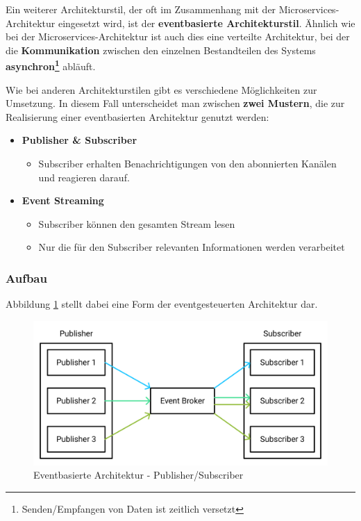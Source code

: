     Ein weiterer Architekturstil, der oft im Zusammenhang mit der Microservices-Architektur eingesetzt wird, ist der \textbf{eventbasierte Architekturstil}. Ähnlich wie bei der Microservices-Architektur ist auch dies eine verteilte Architektur, bei der die \textbf{Kommunikation} zwischen den einzelnen Bestandteilen des Systems \textbf{asynchron\footnote{Senden/Empfangen von Daten ist zeitlich versetzt}} abläuft. \\
    \cite[S. 183]{EA:Book02}

    Wie bei anderen Architekturstilen gibt es verschiedene Möglichkeiten zur Umsetzung. In diesem Fall unterscheidet man zwischen \textbf{zwei Mustern}, die zur Realisierung einer eventbasierten Architektur genutzt werden:
    \begin{itemize}
        \item \textbf{Publisher \& Subscriber}
        \begin{itemize}[label=$\circ$]
            \item Subscriber erhalten Benachrichtigungen von den abonnierten Kanälen und reagieren darauf.  
        \end{itemize}
        
        \item \textbf{Event Streaming}
        \begin{itemize}[label=$\circ$]
            \item Subscriber können den gesamten Stream lesen
            \item Nur die für den Subscriber relevanten Informationen werden verarbeitet
        \end{itemize}
    \end{itemize}

    \cite{EA:Web63}


    
        \subsubsection{Aufbau}

        Abbildung \ref{fig:event-driven-architecture-topology} stellt dabei eine Form der eventgesteuerten Architektur dar.

        \begin{figure}[H]
            \centering
            \includegraphics[width=0.9\linewidth]{images/EA/even-driven-architecture.png}
            \caption{Eventbasierte Architektur - Publisher/Subscriber \\ \cite{EA:Img02}}
            \label{fig:event-driven-architecture-topology}
        \end{figure}

